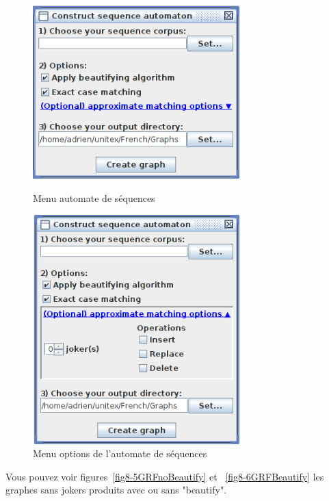 \begin{figure}[!ht]
	\begin{minipage}[h!]{0.5\linewidth}	
		\centering
			\includegraphics[width=8cm]{resources/img/fig8-4Menu1.png}
			\caption{Menu automate de séquences\label{fig8-4Menu1}}
	\end{minipage}	
	\hspace{0.3cm}
	\begin{minipage}[h!]{0.5\linewidth}	
		\centering
			\includegraphics[width=8cm]{resources/img/fig8-4Menu2.png}
			\caption{Menu options de l'automate de séquences\label{fig8-4Menu2}}
	\end{minipage}
\end{figure}

\bigskip
\noindent Vous pouvez voir figures~\ref{fig8-5GRFnoBeautify} et ~\ref{fig8-6GRFBeautify} les graphes
sans jokers produits avec ou sans "beautify".


